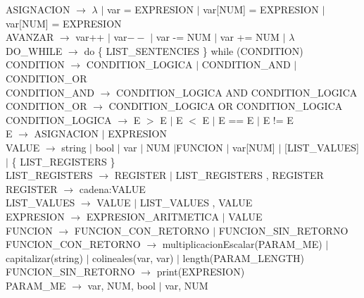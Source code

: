 \documentclass[10pt,a4paper]{article}
\begin{document}
ASIGNACION $\rightarrow$ $\lambda$ $|$ var = EXPRESION $|$ var[NUM] = EXPRESION $|$ var[NUM] = EXPRESION\\

AVANZAR $\rightarrow$ var++ $|$ var$--$ $|$ var -= NUM $|$ var += NUM $|$ $\lambda$ \\

DO\_WHILE $\rightarrow$ do \{ LIST\_SENTENCIES \} while (CONDITION) \\

CONDITION $\rightarrow$ CONDITION\_LOGICA $|$ CONDITION\_AND $|$ CONDITION\_OR \\

CONDITION\_AND $\rightarrow$ CONDITION\_LOGICA AND CONDITION\_LOGICA \\

CONDITION\_OR $\rightarrow$ CONDITION\_LOGICA OR CONDITION\_LOGICA \\

CONDITION\_LOGICA $\rightarrow$ E $>$ E $|$ E $<$ E $|$ E == E $|$ E != E \\

E $\rightarrow$ ASIGNACION $|$ EXPRESION \\

VALUE $\rightarrow$ string $|$ bool $|$ var $|$ NUM $|$FUNCION $|$ var[NUM] $|$ [LIST\_VALUES] $|$ \{ LIST\_REGISTERS \}\\

LIST\_REGISTERS $\rightarrow$ REGISTER $|$ LIST\_REGISTERS , REGISTER \\

REGISTER $\rightarrow$ cadena:VALUE \\

LIST\_VALUES $\rightarrow$ VALUE $|$ LIST\_VALUES , VALUE \\

EXPRESION $\rightarrow$  EXPRESION\_ARITMETICA $|$ VALUE \\

FUNCION $\rightarrow$ FUNCION\_CON\_RETORNO $|$ FUNCION\_SIN\_RETORNO \\

FUNCION\_CON\_RETORNO $\rightarrow$ multiplicacionEscalar(PARAM\_ME) $|$  capitalizar(string) $|$  colineales(var, var) $|$ length(PARAM\_LENGTH) \\

FUNCION\_SIN\_RETORNO $\rightarrow$ print(EXPRESION) \\

PARAM\_ME $\rightarrow$ var, NUM, bool $|$ var, NUM \\
\end{document}

